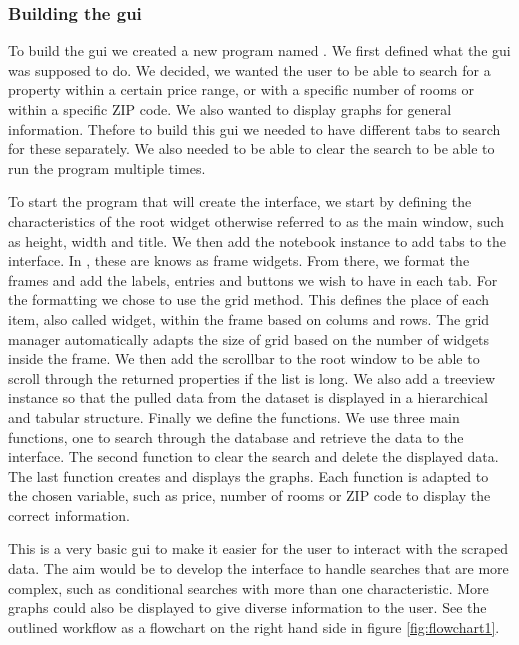 \documentclass[main]{subfiles}
\begin{document}
\subsubsection{Building the \ac{gui}}
To build the \ac{gui} we created a new program named \pkg[main5.py].
We first defined what the \ac{gui} was supposed to do.
We decided, we wanted the user to be able to search for a property within a certain price range, 
or with a specific number of rooms or within a specific ZIP code. We also wanted to display graphs for general information.
Thefore to build this \ac{gui} we needed to have different tabs to search for these separately.
We also needed to be able to clear the search to be able to run the program multiple times. \par
To start the program that will create the interface, we start by defining the characteristics of the root widget otherwise referred to as the main window,
such as height, width and title. We then add the notebook instance to add tabs to the interface.
In \pkg[tkinter], these are knows as frame widgets. From there, we format the frames and add the labels, entries and buttons we wish to have in each tab. 
For the formatting we chose to use the grid method. This defines the place of each item, also called widget, within the frame based on colums and rows.
The grid manager automatically adapts the size of grid based on the number of widgets inside the frame. 
We then add the scrollbar to the root window to be able to scroll through the returned properties if the list is long. 
We also add a treeview instance so that the pulled data from the dataset is displayed in a hierarchical and tabular structure. 
Finally we define the functions. We use three main functions, one to search through the database and retrieve the data to the interface. 
The second function to clear the search and delete the displayed data. The last function creates and displays the graphs. 
Each function is adapted to the chosen variable, such as price, number of rooms or ZIP code to display the correct information.\par
This is a very basic \ac{gui} to make it easier for the user to interact with the scraped data.
The aim would be to develop the interface to handle searches that are more complex, such as conditional searches with more than one characteristic.
More graphs could also be displayed to give diverse information to the user. 
See the outlined workflow as a flowchart on the right hand side in figure \ref{fig:flowchart1}.
\end{document}
